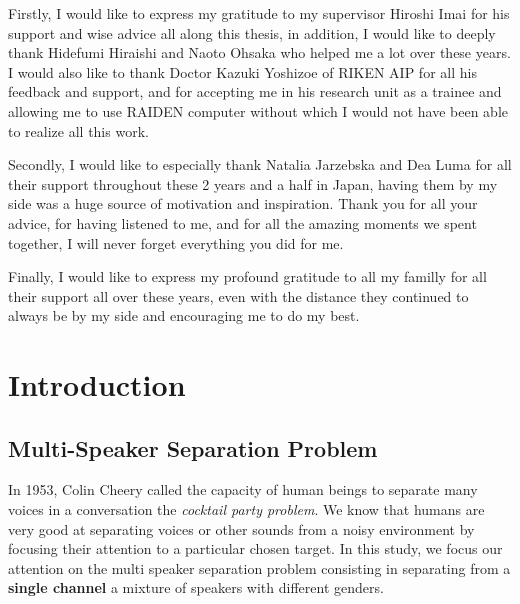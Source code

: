 \documentclass[master, tikz, final,11pt, dvipdfmx]{iscs-thesis}
\begin{document}
\maketitle

\begin{acknowledge}

Firstly, I would like to express my gratitude to my supervisor Hiroshi Imai for his support and wise advice all along this thesis, in addition, I would like to deeply thank Hidefumi Hiraishi and Naoto Ohsaka who helped me a lot over these years. I would also like to thank Doctor Kazuki Yoshizoe of RIKEN AIP for all his feedback and support, and for accepting me in his research unit as a trainee and allowing me to use RAIDEN computer without which I would not have been able to realize all this work.

Secondly, I would like to especially thank Natalia Jarzebska and Dea Luma for all their support throughout these 2 years and a half in Japan, having them by my side was a huge source of motivation and inspiration. Thank you for all your advice, for having listened to me, and for all the amazing moments we spent together, I will never forget everything you did for me.

Finally, I would like to express my profound gratitude to all my familly for all their support all over these years, even with the distance they continued to always be by my side and encouraging me to do my best.

\end{acknowledge}


\newpage

\tableofcontents

\newpage

\listoffigures %

\listoftables %


\chapter{Introduction}


\section{Multi-Speaker Separation Problem}
In 1953, Colin Cheery called the capacity of human beings to separate many voices in a conversation the \textit{cocktail party problem}. We know that humans are very good at separating voices or other sounds from a noisy environment by focusing their attention to a particular chosen target. In this study, we focus our attention on the multi speaker separation problem consisting in separating from a \textbf{single channel} a mixture of speakers with different genders. 
\end{document}
